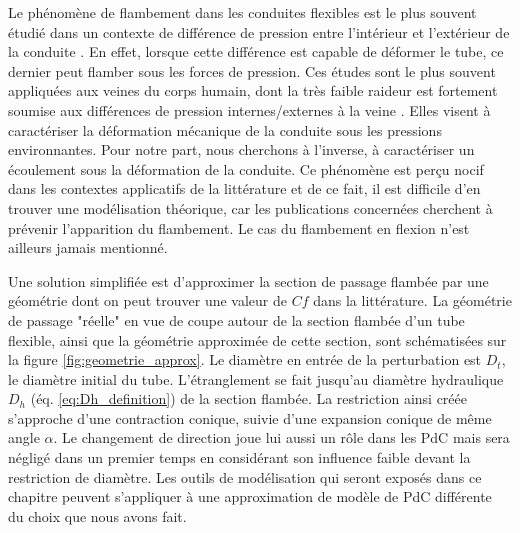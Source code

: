 Le phénomène de flambement dans les conduites flexibles est le plus souvent étudié dans un contexte de différence de pression entre l'intérieur et l'extérieur de la conduite \cite{Conrad1969,Heil1996,Ribeau1994,Elad1992}. En effet, lorsque cette différence est capable de déformer le tube, ce dernier peut flamber sous les forces de pression. Ces études sont le plus souvent appliquées aux veines du corps humain, dont la très faible raideur est fortement soumise aux différences de pression internes/externes à la veine \cite{Podoprosvetova2021,Nahar2019,Ghazy2018}. Elles visent à caractériser la déformation mécanique de la conduite sous les pressions environnantes. Pour notre part, nous cherchons à  l'inverse, à caractériser un écoulement sous la déformation de la conduite. Ce phénomène est perçu nocif dans les contextes applicatifs de la littérature et de ce fait, il est difficile d'en trouver une modélisation théorique, car les publications concernées cherchent à prévenir l'apparition du flambement. Le cas du flambement en flexion n'est ailleurs jamais mentionné.

Une solution simplifiée est d'approximer la section de passage flambée par une géométrie dont on peut trouver une valeur de $Cf$ dans la littérature. La géométrie de passage "réelle" en vue de coupe autour de la section flambée d'un tube flexible, ainsi que la géométrie approximée de cette section, sont schématisées sur la figure \ref{fig:geometrie_approx}. Le diamètre en entrée de la perturbation est $D_t$, le diamètre initial du tube. L'étranglement se fait jusqu'au diamètre hydraulique $D_h$ (éq. \ref{eq:Dh_definition}) de la section flambée.  La restriction ainsi créée s'approche d'une contraction conique, suivie d'une expansion conique de même angle $\alpha$. Le changement de direction joue lui aussi un rôle dans les PdC mais sera négligé dans un premier temps en considérant son influence faible devant la restriction de diamètre. Les outils de modélisation qui seront exposés dans ce chapitre peuvent s'appliquer à une approximation de modèle de PdC différente du choix que nous avons fait.

